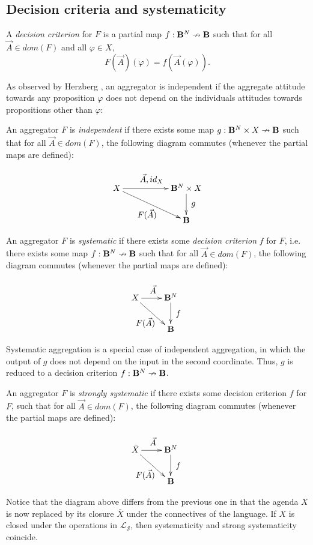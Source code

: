 \documentclass{llncs}
\numberwithin{equation}{section}
\newcommand{\s}{\mathcal{S}}
\newcommand{\Ls}{\mathcal{L}_{\s}}
\begin{document}
\subsection{Decision criteria and systematicity}

A \emph{decision criterion} for $F$ is a partial map $f:\mathbf{B}^{N}\nrightarrow \mathbf{B}$ such that for all $\vec{A}\in dom (F)$ and all $\varphi\in X$,
\begin{equation}\label{eq1}
F(\vec{A})(\varphi)= f(\vec{A}(\varphi)).
\end{equation}

As observed by Herzberg \cite{He13}, an aggregator is independent if the aggregate attitude towards any proposition $\varphi$ does not depend on the individuals attitudes towards propositions other than $\varphi$:

An aggregator $F$ is \emph{independent} if there exists some map $g:\mathbf{B}^{N}\times X\nrightarrow \mathbf{B}$ such that for all $\vec{A}\in dom(F)$, the following diagram commutes (whenever the partial maps are defined):

$$\xymatrix{
{X} && {\BB^{N}\times X} \ar[ll];[]^*+[o]{\vec{A}, id_{X}} \\
&& {\BB}  \ar[ull];[]_*+[o]{F(\vec{A})}  \ar[u];[]^*+[o]{g}}
$$

An aggregator $F$ is \emph{systematic} if there exists some \emph{decision criterion} $f$ for $F$, i.e. there exists some map $f:\mathbf{B}^{N}\nrightarrow \mathbf{B}$ such that for all $\vec{A}\in dom(F)$, the following diagram commutes (whenever the partial maps are defined):

$$\xymatrix{
{X} & {\BB^{N}} \ar[l];[]^*+[o]{\vec{A}} \\
& {\BB}  \ar[ul];[]_*+[o]{F(\vec{A})}  \ar[u];[]^*+[o]{f}}
$$

Systematic aggregation is a special case of independent aggregation, in which the output of $g$ does not depend on the input in the second coordinate.
Thus, $g$ is reduced to a decision criterion $f:\mathbf{B}^{N}\nrightarrow \mathbf{B}$.

An aggregator $F$ is \emph{strongly systematic} if there exists some decision criterion $f$ for $F$, such that for all $\vec{A}\in dom(F)$, the following diagram commutes (whenever the partial maps are defined):
	
$$\xymatrix{
{\bar{X}} & {\BB^{N}} \ar[l];[]^*+[o]{\vec{A}} \\
& {\BB}  \ar[ul];[]_*+[o]{F(\vec{A})}  \ar[u];[]^*+[o]{f}}
$$

Notice that the diagram above differs from the previous one in that the agenda $X$ is now replaced by its closure $\bar{X}$ under the connectives of the language. If $X$ is closed under the operations in $\Ls$, then systematicity and strong systematicity coincide.
\end{document}
